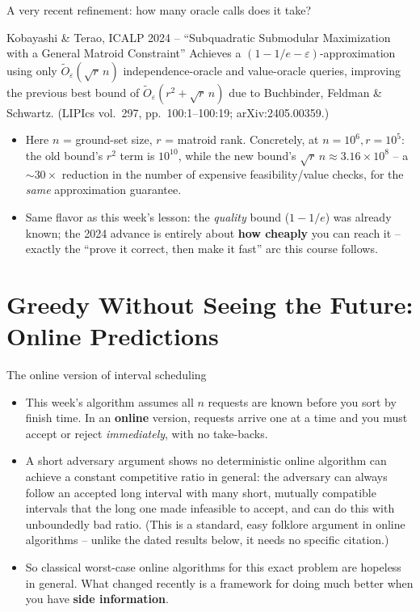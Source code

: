 \documentclass[11pt,aspectratio=169]{beamer}
\begin{document}
\begin{frame}{A very recent refinement: how many oracle calls does it take?}
  \small
  \begin{block}{Kobayashi \& Terao, ICALP 2024 -- ``Subquadratic Submodular
  Maximization with a General Matroid Constraint''}
    Achieves a $(1-1/e-\varepsilon)$-approximation using only
    $\widetilde{O}_\varepsilon(\sqrt{r}\,n)$ independence-oracle and value-oracle
    queries, improving the previous best bound of
    $\widetilde{O}_\varepsilon(r^2 + \sqrt{r}\,n)$ due to Buchbinder, Feldman \&
    Schwartz. (LIPIcs vol.\ 297, pp.\ 100:1--100:19; arXiv:2405.00359.)
  \end{block}
  \begin{itemize}
    \item Here $n$ = ground-set size, $r$ = matroid rank. Concretely, at
    $n = 10^6, r = 10^5$: the old bound's $r^2$ term is $10^{10}$, while the new bound's
    $\sqrt{r}\,n \approx 3.16\times 10^8$ -- a $\sim 30\times$ reduction in the number
    of expensive feasibility/value checks, for the \emph{same} approximation guarantee.
    \item Same flavor as this week's lesson: the \emph{quality} bound ($1-1/e$) was
    already known; the 2024 advance is entirely about \textbf{how cheaply} you can
    reach it -- exactly the ``prove it correct, then make it fast'' arc this course
    follows.
  \end{itemize}
\end{frame}

\section{Greedy Without Seeing the Future: Online Predictions}

\begin{frame}{The online version of interval scheduling}
  \begin{itemize}
    \item This week's algorithm assumes all $n$ requests are known before you sort by
    finish time. In an \textbf{online} version, requests arrive one at a time and you
    must accept or reject \emph{immediately}, with no take-backs.
    \item A short adversary argument shows no deterministic online algorithm can
    achieve a constant competitive ratio in general: the adversary can always follow
    an accepted long interval with many short, mutually compatible intervals that the
    long one made infeasible to accept, and can do this with unboundedly bad ratio.
    (This is a standard, easy folklore argument in online algorithms -- unlike the
    dated results below, it needs no specific citation.)
    \item So classical worst-case online algorithms for this exact problem are
    hopeless in general. What changed recently is a framework for doing much better
    when you have \textbf{side information}.
  \end{itemize}
\end{frame}
\end{document}
